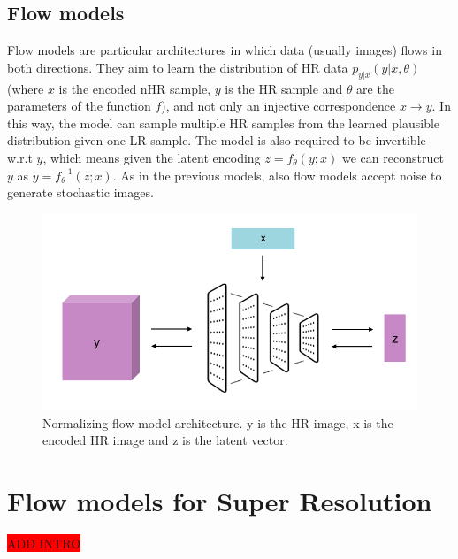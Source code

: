 \documentclass{article}
\begin{document}
\subsection{Flow models}
Flow models are particular architectures in which data (usually images) flows in both directions. They aim to learn the distribution of HR data $p_{y|x}(y|x, \theta)$ (where $x$ is the encoded nHR sample, $y$ is the HR sample and $\theta$ are the parameters of the function $f$), and not only an injective correspondence $x \rightarrow y$. In this way, the model can sample multiple HR samples from the learned plausible distribution given one LR sample. The model is also required to be invertible w.r.t $y$, which means given the latent encoding $z = f_{\theta}(y;x)$ we can reconstruct $y$ as $y = f_{\theta}^{-1}(z;x)$. As in the previous models, also flow models accept noise to generate stochastic images.
\begin{figure}[h]
    \centering
    \includegraphics[scale=.6]{flow.png}
    \caption{Normalizing flow model architecture. y is the HR image, x is the encoded HR image and z is the latent vector.}
    \label{img:vae}
\end{figure}


\newpage
\section{Flow models for Super Resolution}\label{sec:model}
\colorbox{red}{ADD INTRO} \\
\end{document}
